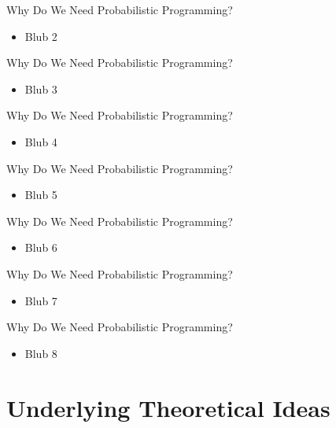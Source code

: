 \documentclass[AERbeamer%
              ,optEnglish%
              ,optBiber%
              ,optBibstyleAlphabetic%
              ,optBeamerClassicFormat%
              ]{AERlatex}%
\begin{document}
\begin{frame}[c]{Why Do We Need Probabilistic Programming?}
    \centering
    \begin{itemize}
        \item Blub 2
    \end{itemize}
\end{frame}


\begin{frame}[c]{Why Do We Need Probabilistic Programming?}
    \centering
    \begin{itemize}
        \item Blub 3
    \end{itemize}
\end{frame}


\begin{frame}[c]{Why Do We Need Probabilistic Programming?}
    \centering
    \begin{itemize}
        \item Blub 4
    \end{itemize}
\end{frame}


\begin{frame}[c]{Why Do We Need Probabilistic Programming?}
    \centering
    \begin{itemize}
        \item Blub 5
    \end{itemize}
\end{frame}


\begin{frame}[c]{Why Do We Need Probabilistic Programming?}
    \centering
    \begin{itemize}
        \item Blub 6
    \end{itemize}
\end{frame}


\begin{frame}[c]{Why Do We Need Probabilistic Programming?}
    \centering
    \begin{itemize}
        \item Blub 7
    \end{itemize}
\end{frame}


\begin{frame}[c]{Why Do We Need Probabilistic Programming?}
    \centering
    \begin{itemize}
        \item Blub 8
    \end{itemize}
\end{frame}



\section{Underlying Theoretical Ideas}








%
%
%
%
\end{document}
